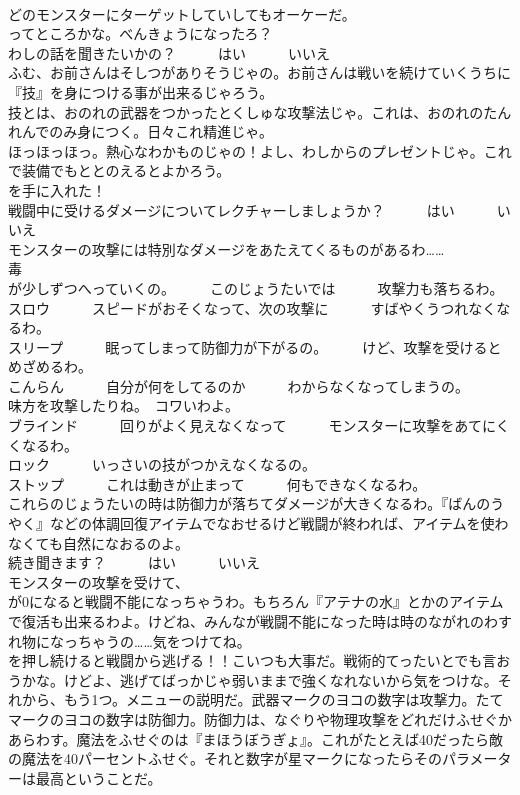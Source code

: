 \documentclass[8pt]{extreport}
\begin{document}
\begin{CJK}{UTF8}{min}
\\	どのモンスターにターゲットしていしてもオーケーだ。	
\\	ってところかな。べんきょうになったろ？	
\\	わしの話を聞きたいかの？　　　はい　　　いいえ	
\\	ふむ、お前さんはそしつがありそうじゃの。お前さんは戦いを続けていくうちに『技』を身につける事が出来るじゃろう。	
\\	技とは、おのれの武器をつかったとくしゅな攻撃法じゃ。これは、おのれのたんれんでのみ身につく。日々これ精進じゃ。	
\\	ほっほっほっ。熱心なわかものじゃの！よし、わしからのプレゼントじゃ。これで装備でもととのえるとよかろう。	
\\	を手に入れた！	
\\	戦闘中に受けるダメージについてレクチャーしましょうか？　　　はい　　　いいえ	
\\	モンスターの攻撃には特別なダメージをあたえてくるものがあるわ……	
\\	毒　　　
\\	が少しずつへっていくの。　　　このじょうたいでは　　　攻撃力も落ちるわ。	
\\	スロウ　　　スピードがおそくなって、次の攻撃に　　　すばやくうつれなくなるわ。	
\\	スリープ　　　眠ってしまって防御力が下がるの。　　　けど、攻撃を受けるとめざめるわ。	
\\	こんらん　　　自分が何をしてるのか　　　わからなくなってしまうの。　　　味方を攻撃したりね。　コワいわよ。	
\\	ブラインド　　　回りがよく見えなくなって　　　モンスターに攻撃をあてにくくなるわ。	
\\	ロック　　　いっさいの技がつかえなくなるの。	
\\	ストップ　　　これは動きが止まって　　　何もできなくなるわ。	
\\	これらのじょうたいの時は防御力が落ちてダメージが大きくなるわ。『ばんのうやく』などの体調回復アイテムでなおせるけど戦闘が終われば、アイテムを使わなくても自然になおるのよ。	
\\	続き聞きます？　　　はい　　　いいえ	
\\	モンスターの攻撃を受けて、
\\	が0になると戦闘不能になっちゃうわ。もちろん『アテナの水』とかのアイテムで復活も出来るわよ。けどね、みんなが戦闘不能になった時は時のながれのわすれ物になっちゃうの……気をつけてね。	
\\	を押し続けると戦闘から逃げる！！こいつも大事だ。戦術的てったいとでも言おうかな。けどよ、逃げてばっかじゃ弱いままで強くなれないから気をつけな。それから、もう1つ。メニューの説明だ。武器マークのヨコの数字は攻撃力。たてマークのヨコの数字は防御力。防御力は、なぐりや物理攻撃をどれだけふせぐかあらわす。魔法をふせぐのは『まほうぼうぎょ』。これがたとえば40だったら敵の魔法を40パーセントふせぐ。それと数字が星マークになったらそのパラメーターは最高ということだ。	

\end{CJK}
\end{document}
